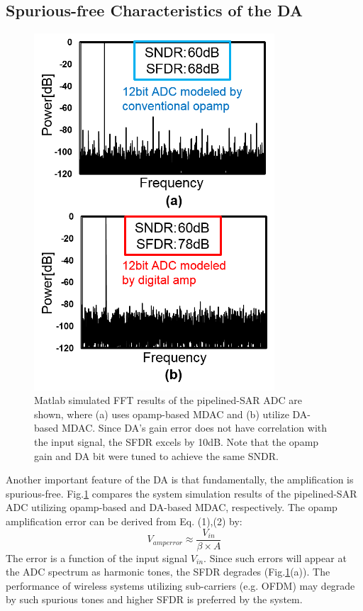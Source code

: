 \color{black}

\subsection{Spurious-free Characteristics of the DA}
\begin{figure}[!]
\centering
  \includegraphics[width=0.8\textwidth]{figure/chap2/spur.png}
  \caption{Matlab simulated FFT results of the pipelined-SAR ADC are shown, where (a) uses opamp-based MDAC and (b) utilize DA-based MDAC. Since DA's gain error does not have correlation with the input signal, the SFDR excels by 10dB. Note that the opamp gain and DA bit were tuned to achieve the same SNDR. }
  \label{fig-spur}
\end{figure}

Another important feature of the DA is that fundamentally, the amplification is spurious-free.
Fig.\ref{fig-spur} compares the system simulation results of the pipelined-SAR ADC utilizing opamp-based and DA-based MDAC, respectively. The opamp amplification error can be derived from Eq. (1),(2) by:
\begin{equation}
    V_{amperror} \approx \frac{V_{in}}{\beta \times A}
\end{equation}
The error is a function of the input signal $V_{in}$. Since such errors will appear at the ADC spectrum as harmonic tones, the SFDR degrades  (Fig.\ref{fig-spur}(a)). The performance of wireless systems utilizing sub-carriers (e.g. OFDM) may degrade by such spurious tones and higher SFDR is preferred by the system. 

